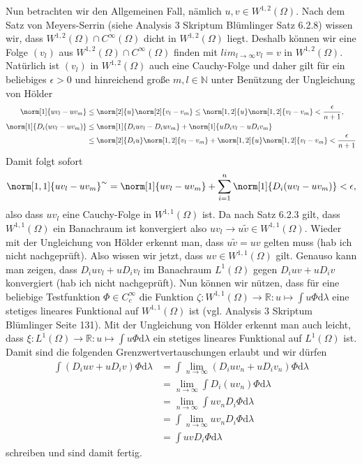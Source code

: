 \begin{solution}
Nun betrachten wir den Allgemeinen Fall, nämlich $u,v\in W^{1,2}(\Omega)$. Nach dem Satz von Meyers-Serrin (siehe Analysis 3 Skriptum Blümlinger Satz 6.2.8) wissen wir, dass $W^{1,2}(\Omega)\cap C^\infty(\Omega)$ dicht in $W^{1,2}(\Omega)$ liegt. Deshalb können wir eine Folge $(v_l)$ aus $W^{1,2}(\Omega)\cap C^\infty(\Omega)$ finden mit $lim_{l\to\infty}v_l=v$ in $W^{1,2}(\Omega)$. Natürlich ist $(v_l)$ in $W^{1,2}(\Omega)$ auch eine Cauchy-Folge und daher gilt für ein beliebiges $\epsilon>0$ und hinreichend große $m,l\in\mathbb{N}$ unter Benützung der Ungleichung von Hölder
\begin{align*}
    \norm[1]{uv_l-uv_m}&\leq\norm[2]{u}\norm[2]{v_l-v_m}\leq\norm[1,2]{u}\norm[1,2]{v_l-v_m}<\frac{\epsilon}{n+1},\\
    \norm[1]{D_i(uv_l-uv_m)}&\leq\norm[1]{D_iuv_l-D_iuv_m}+\norm[1]{uD_iv_l-uD_iv_m}\\
    &\leq\norm[2]{D_iu}\norm[1,2]{v_l-v_m}+\norm[1,2]{u}\norm[1,2]{v_l-v_m}<\frac{\epsilon}{n+1}
\end{align*}
Damit folgt sofort
\begin{align*}
    \norm[1,1]{uv_l-uv_m}^\sim=\norm[1]{uv_l-uv_m}+\sum_{i=1}^n\norm[1]{D_i(uv_l-uv_m)}<\epsilon,
\end{align*}
also dass $uv_l$ eine Cauchy-Folge in $W^{1,1}(\Omega)$ ist. Da nach Satz 6.2.3 gilt, dass $W^{1,1}(\Omega)$ ein Banachraum ist konvergiert also $uv_l\to u\tilde{v}\in W^{1,1}(\Omega)$. Wieder mit der Ungleichung von Hölder erkennt man, dass $u\tilde{v}=uv$ gelten muss (hab ich nicht nachgeprüft). Also wissen wir jetzt, dass $uv\in W^{1,1}(\Omega)$ gilt. Genauso kann man zeigen, dass $D_iuv_l+uD_iv_l$ im Banachraum $L^1(\Omega)$ gegen $D_iuv+uD_iv$ konvergiert (hab ich nicht nachgeprüft). Nun können wir nützen, dass für eine beliebige Testfunktion $\Phi \in C_c^\infty$ die Funktion $\zeta:W^{1,1}(\Omega)\to\mathbb{R}:u\mapsto\int u\Phi\mathrm{d}\lambda$ eine stetiges lineares Funktional auf $W^{1,1}(\Omega)$ ist (vgl. Analysis 3 Skriptum Blümlinger Seite 131). Mit der Ungleichung von Hölder erkennt man auch leicht, dass $\xi:L^1(\Omega)\to\mathbb{R}:u\mapsto\int u\Phi\mathrm{d}\lambda$ ein stetiges lineares Funktional auf $L^1(\Omega)$ ist. Damit sind die folgenden Grenzwertvertauschungen erlaubt und wir dürfen
\begin{align*}
    \int (D_iuv+uD_iv)\Phi\mathrm{d}\lambda&=\int \lim_{n\to\infty}(D_iuv_n+uD_iv_n)\Phi\mathrm{d}\lambda\\
    &=\lim_{n\to\infty}\int D_i(uv_n)\Phi\mathrm{d}\lambda\\
    &=\lim_{n\to\infty}\int uv_nD_i\Phi\mathrm{d}\lambda\\
    &=\int\lim_{n\to\infty}uv_nD_i\Phi\mathrm{d}\lambda\\
    &=\int uvD_i\Phi\mathrm{d}\lambda
\end{align*} 
schreiben und sind damit fertig.
\end{solution}
